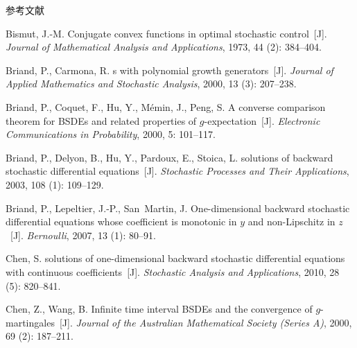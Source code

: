 \documentclass[xcolor=svgnames,serif,table,10pt]{beamer}
\begin{document}
\begin{frame}[allowframebreaks]{参考文献}
\tiny
\sffamily
\begin{thebibliography}{57}

Bismut, J.-M.
\newblock Conjugate convex functions in optimal stochastic control~[J].
\newblock \emph{Journal of Mathematical Analysis and Applications}, 1973,
  44 (2): 384--404.

Briand, P., Carmona, R.
s with polynomial growth generators~[J].
\newblock \emph{Journal of Applied Mathematics and Stochastic Analysis}, 2000,
  13 (3): 207--238.

Briand, P., Coquet, F., Hu, Y., M\'{e}min, J., Peng, S.
\newblock A converse comparison theorem for {BSDE}s and related properties of
  $g$-expectation~[J].
\newblock \emph{Electronic Communications in Probability}, 2000, 5:
  101--117.

Briand, P., Delyon, B., Hu, Y., Pardoux, E., Stoica, L.
 solutions of backward stochastic differential equations~[J].
\newblock \emph{Stochastic Processes and Their Applications}, 2003,
  108 (1): 109--129.

Briand, P., Lepeltier, J.-P., San~Martin, J.
\newblock One-dimensional backward stochastic differential equations whose
  coefficient is monotonic in $y$ and non-{L}ipschitz in $z$~[J].
\newblock \emph{Bernoulli}, 2007, 13 (1): 80--91.

Chen, S.
 solutions of one-dimensional backward stochastic differential
  equations with continuous coefficients~[J].
\newblock \emph{Stochastic Analysis and Applications}, 2010, 28
  (5): 820--841.

Chen, Z., Wang, B.
\newblock Infinite time interval {BSDE}s and the convergence of
  $g$-martingales~[J].
\newblock \emph{Journal of the Australian Mathematical Society (Series A)},
  2000, 69 (2): 187--211.


\end{thebibliography}
\end{frame}
\end{document}
